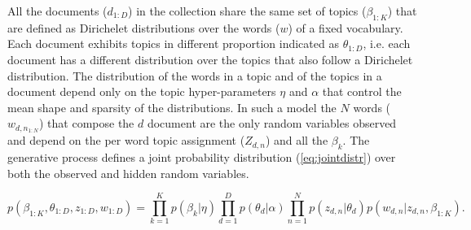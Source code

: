 All the documents ($d_{1:D}$) in the collection share the same set of topics ($\beta_{1:K}$) that are defined as Dirichelet distributions over the words ($w$) of a fixed vocabulary. Each document exhibits topics in different proportion indicated as $\theta_{1:D}$, i.e. each document has a different distribution over the topics that also follow a Dirichelet distribution. The distribution of the words in a topic and of the topics in a document depend only on the topic hyper-parameters $\eta$ and $\alpha$ that control the mean shape and sparsity of the distributions. In such a model the $N$ words ($w_{d,n_{1:N}}$) that compose the $d$ document are the only random variables observed and depend on the per word topic assignment ($Z_{d,n}$) and all the $\beta_{k}$.
%
%
%
%
The generative process defines a joint probability distribution (\ref{eq:jointdistr}) over both the observed and hidden random variables. 

\begin{dmath}
  p(\beta_{1:K},\theta_{1:D},z_{1:D},w_{1:D}) = \prod_{k=1}^{K} p(\beta_{k}|\eta) \prod_{d=1}^{D} p(\theta_{d}|\alpha) \prod_{n=1}^{N} p(z_{d,n}|\theta_{d}) p(w_{d,n}|z_{d,n},\beta_{1:K}).
  \label{eq:jointdistr}
\end{dmath}

